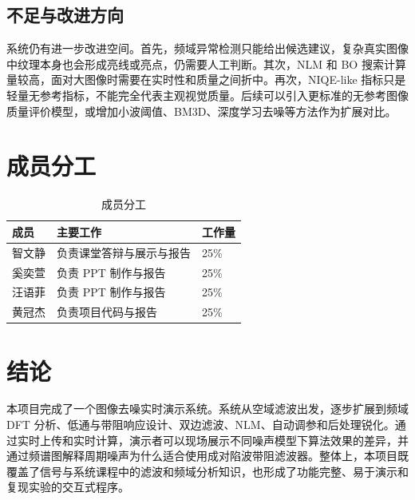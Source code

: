 \documentclass[UTF8,a4paper,12pt]{ctexart}
\begin{document}
\subsection{不足与改进方向}

系统仍有进一步改进空间。首先，频域异常检测只能给出候选建议，复杂真实图像中纹理本身也会形成亮线或亮点，仍需要人工判断。其次，NLM 和 BO 搜索计算量较高，面对大图像时需要在实时性和质量之间折中。再次，NIQE-like 指标只是轻量无参考指标，不能完全代表主观视觉质量。后续可以引入更标准的无参考图像质量评价模型，或增加小波阈值、BM3D、深度学习去噪等方法作为扩展对比。

\section*{成员分工}

\begin{table}[H]
\centering
\caption{成员分工}
\begin{tabular}{lll}
\toprule
成员 & 主要工作 & 工作量 \\
\midrule
智文静 & 负责课堂答辩与展示与报告 & 25\% \\
奚奕萱 & 负责 PPT 制作与报告 & 25\% \\
汪语菲 & 负责 PPT 制作与报告 & 25\% \\
黄冠杰 & 负责项目代码与报告 & 25\% \\
\bottomrule
\end{tabular}
\end{table}

\section*{结论}

本项目完成了一个图像去噪实时演示系统。系统从空域滤波出发，逐步扩展到频域 DFT 分析、低通与带阻响应设计、双边滤波、NLM、自动调参和后处理锐化。通过实时上传和实时计算，演示者可以现场展示不同噪声模型下算法效果的差异，并通过频谱图解释周期噪声为什么适合使用成对陷波带阻滤波器。整体上，本项目既覆盖了信号与系统课程中的滤波和频域分析知识，也形成了功能完整、易于演示和复现实验的交互式程序。
\end{document}
